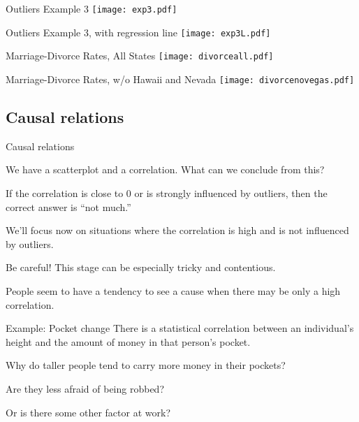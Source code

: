 \documentclass{beamer}
\begin{document}
\begin{frame}{Outliers Example 3}
\texttt{[image: exp3.pdf]}
\end{frame}

\begin{frame}{Outliers Example 3, with regression line}
\texttt{[image: exp3L.pdf]}
\end{frame}

\begin{frame}{Marriage-Divorce Rates, All States}
\texttt{[image: divorceall.pdf]}
\end{frame}

\begin{frame}{Marriage-Divorce Rates, w/o Hawaii and Nevada}
\texttt{[image: divorcenovegas.pdf]}
\end{frame}

\subsection{Causal relations}

\begin{frame}{Causal relations}

We have a scatterplot and a correlation.
What can we conclude from this?

\vfill
If the correlation is close to 0 or is strongly
influenced by outliers, then the correct answer is
``not much.''

\vfill
We'll focus now on situations where the correlation
is high and is not influenced by outliers.
\end{frame}

\begin{frame}{Be careful!}
This stage can be especially tricky and contentious.

\vfill
People seem to have a tendency to see a cause when
there may be only a high correlation.
\end{frame}

\begin{frame}{Example:  Pocket change}
There is a statistical correlation between
an individual's height and the amount of money in
that person's pocket.

\pause
\vfill
Why do taller people tend to carry more money in
their pockets?

\pause
\vfill
Are they less afraid of being robbed?

\pause
\vfill
Or is there some other factor at work?
\end{frame}
\end{document}
